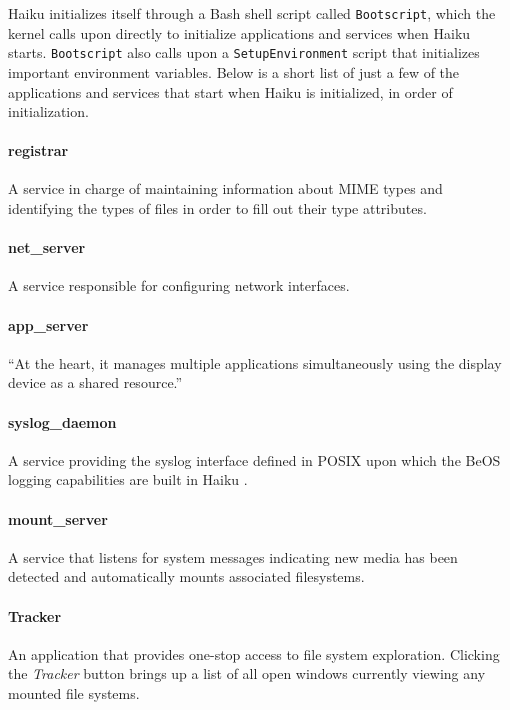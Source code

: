 \documentclass{article}
\begin{document}
Haiku initializes itself through a Bash shell script called \texttt{Bootscript}, which the kernel calls upon directly to initialize applications and services when Haiku starts. \texttt{Bootscript} also calls upon a \texttt{SetupEnvironment} script that initializes important environment variables. Below is a short list of just a few of the applications and services that start when Haiku is initialized, in order of initialization.

\paragraph{registrar}
A service in charge of maintaining information about MIME types and
identifying the types of files in order to fill out their type
attributes. \cite{RegistrarInfo}

\paragraph{net\_server}
A service responsible for configuring network
interfaces. \cite{NetServerSource}

\paragraph{app\_server}
``At the heart, it manages multiple applications simultaneously using the display device as a shared resource.''\cite{AppServer}

\paragraph{syslog\_daemon}
A service providing the syslog interface defined in POSIX upon which
the BeOS logging capabilities are built in Haiku \cite{SyslogInfo}.

\paragraph{mount\_server}
A service that listens for system messages indicating new media has been detected and automatically mounts associated filesystems.\cite{AutoMounter}

\paragraph{Tracker}
An application that provides one-stop access to file system exploration. Clicking the \textit{Tracker} button brings up a list of all open windows currently viewing any mounted file systems.\cite{Tracker}
\end{document}
